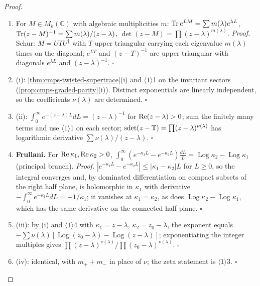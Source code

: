 \begin{proof}
\begin{enumerate}
\item[$\langle1\rangle$1.] For $M\in M_k(\mathbb C)$ with algebraic multiplicities $m$:
$\operatorname{Tr} e^{LM}=\sum m(\lambda)e^{\lambda L}$, $\operatorname{Tr}(z-M)^{-1}=\sum m(\lambda)/(z-\lambda)$,
$\det(z-M)=\prod(z-\lambda)^{m(\lambda)}$. \emph{Proof.} Schur: $M=UTU^\dagger$ with $T$ upper
triangular carrying each eigenvalue $m(\lambda)$ times on the diagonal; $e^{LT}$ and $(z-T)^{-1}$
are upper triangular with diagonals $e^{\lambda L}$ and $(z-\lambda)^{-1}$. $\square$
\item[$\langle1\rangle$2.] (i): \cref{thm:cmps-twisted-supertrace}(i) and $\langle1\rangle$1 on the
invariant sectors (\cref{prop:cmps-graded-parity}(i)). Distinct exponentials are linearly
independent, so the coefficients $\nu(\lambda)$ are determined. $\square$
\item[$\langle1\rangle$3.] (ii): $\int_0^\infty e^{-(z-\lambda)L}dL=(z-\lambda)^{-1}$ for
$\operatorname{Re}(z-\lambda)>0$; sum the finitely many terms and use $\langle1\rangle$1 on each sector;
$\operatorname{sdet}(z-\mathbb T)=\prod(z-\lambda)^{\nu(\lambda)}$ has logarithmic derivative
$\sum\nu(\lambda)/(z-\lambda)$. $\square$
\item[$\langle1\rangle$4.] \textbf{Frullani.} For $\operatorname{Re}\kappa_1,\operatorname{Re}\kappa_2>0$,
$\int_0^\infty(e^{-\kappa_1 L}-e^{-\kappa_2 L})\frac{dL}{L}=\operatorname{Log}\kappa_2-\operatorname{Log}\kappa_1$
(principal branch). \emph{Proof.} $|e^{-\kappa_1 L}-e^{-\kappa_2 L}|\le|\kappa_1-\kappa_2|L$ for $L\ge0$,
so the integral converges and, by dominated differentiation on compact subsets of the right
half plane, is holomorphic in $\kappa_1$ with derivative $-\int_0^\infty e^{-\kappa_1 L}dL=-1/\kappa_1$;
it vanishes at $\kappa_1=\kappa_2$, as does $\operatorname{Log}\kappa_2-\operatorname{Log}\kappa_1$, which has
the same derivative on the connected half plane. $\square$
\item[$\langle1\rangle$5.] (iii): by (i) and $\langle1\rangle$4 with $\kappa_1=z-\lambda$,
$\kappa_2=z_0-\lambda$, the exponent equals $-\sum\nu(\lambda)[\operatorname{Log}(z_0-\lambda)-
\operatorname{Log}(z-\lambda)]$; exponentiating the integer multiples gives
$\prod(z-\lambda)^{\nu(\lambda)}/\prod(z_0-\lambda)^{\nu(\lambda)}$. $\square$
\item[$\langle1\rangle$6.] (iv): identical, with $m_++m_-$ in place of $\nu$; the zeta statement is
$\langle1\rangle$3. $\square$
\end{enumerate}
\end{proof}

